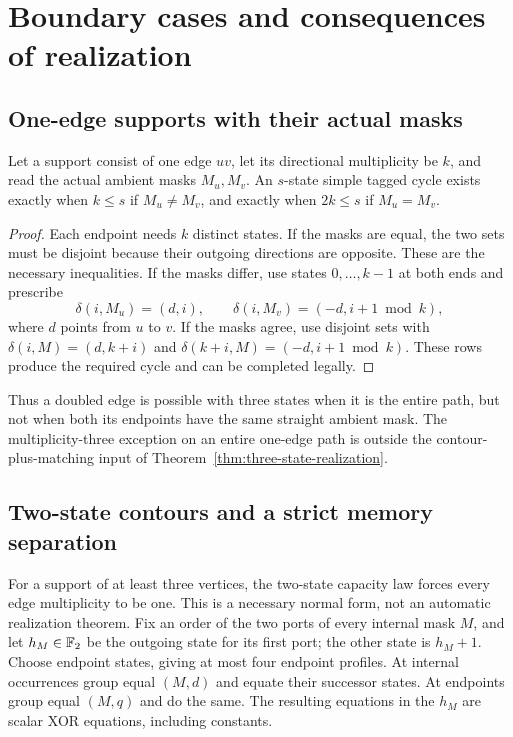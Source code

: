 \section{Boundary cases and consequences of realization}
\label{app:structural-consequences}

\subsection{One-edge supports with their actual masks}
\begin{lemma}\label{lem:one-edge-realization}
Let a support consist of one edge $uv$, let its directional multiplicity be $k$,
and read the actual ambient masks $M_u,M_v$. An $s$-state simple tagged cycle
exists exactly when $k\le s$ if $M_u\ne M_v$, and exactly when $2k\le s$ if
$M_u=M_v$.
\end{lemma}
\begin{proof}
Each endpoint needs $k$ distinct states. If the masks are equal, the two sets
must be disjoint because their outgoing directions are opposite. These are the
necessary inequalities. If the masks differ, use states $0,\ldots,k-1$ at both
ends and prescribe
\[
 \delta(i,M_u)=(d,i),\qquad
 \delta(i,M_v)=(-d,i+1\bmod k),
\]
where $d$ points from $u$ to $v$. If the masks agree, use disjoint sets with
$\delta(i,M)=(d,k+i)$ and $\delta(k+i,M)=(-d,i+1\bmod k)$.
These rows produce the required cycle and can be completed legally.
\end{proof}
Thus a doubled edge is possible with three states when it is the entire path,
but not when both its endpoints have the same straight ambient mask. The
multiplicity-three exception on an entire one-edge path is outside the
contour-plus-matching input of Theorem~\ref{thm:three-state-realization}.

\subsection{Two-state contours and a strict memory separation}
For a support of at least three vertices, the two-state capacity law forces
every edge multiplicity to be one. This is a necessary normal form, not an
automatic realization theorem. Fix an order of the two ports of every internal
mask $M$, and let $h_M\in\mathbb F_2$ be the outgoing state for its first port; the
other state is $h_M+1$. Choose endpoint states, giving at most four endpoint
profiles. At internal occurrences group equal $(M,d)$ and equate their successor
states. At endpoints group equal $(M,q)$ and do the same. The resulting equations
in the $h_M$ are scalar XOR equations, including constants.

